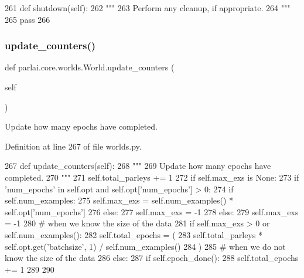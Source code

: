 \begin{DoxyCode}
261     \textcolor{keyword}{def }shutdown(self):
262         \textcolor{stringliteral}{"""}
263 \textcolor{stringliteral}{        Perform any cleanup, if appropriate.}
264 \textcolor{stringliteral}{        """}
265         \textcolor{keywordflow}{pass}
266 
\end{DoxyCode}
\mbox{\label{classparlai_1_1core_1_1worlds_1_1World_a77730e92a331274ab7b6ea3e7b99d1a4}} 
\subsubsection{\texorpdfstring{update\+\_\+counters()}{update\_counters()}}
{\footnotesize\ttfamily def parlai.\+core.\+worlds.\+World.\+update\+\_\+counters (\begin{DoxyParamCaption}\item[{}]{self }\end{DoxyParamCaption})}

\begin{DoxyVerb}Update how many epochs have completed.
\end{DoxyVerb}
 

Definition at line 267 of file worlds.\+py.


\begin{DoxyCode}
267     \textcolor{keyword}{def }update\_counters(self):
268         \textcolor{stringliteral}{"""}
269 \textcolor{stringliteral}{        Update how many epochs have completed.}
270 \textcolor{stringliteral}{        """}
271         self.total\_parleys += 1
272         \textcolor{keywordflow}{if} self.max\_exs \textcolor{keywordflow}{is} \textcolor{keywordtype}{None}:
273             \textcolor{keywordflow}{if} \textcolor{stringliteral}{'num\_epochs'} \textcolor{keywordflow}{in} self.opt \textcolor{keywordflow}{and} self.opt[\textcolor{stringliteral}{'num\_epochs'}] > 0:
274                 \textcolor{keywordflow}{if} self.num\_examples:
275                     self.max\_exs = self.num\_examples() * self.opt[\textcolor{stringliteral}{'num\_epochs'}]
276                 \textcolor{keywordflow}{else}:
277                     self.max\_exs = -1
278             \textcolor{keywordflow}{else}:
279                 self.max\_exs = -1
280         \textcolor{comment}{# when we know the size of the data}
281         \textcolor{keywordflow}{if} self.max\_exs > 0 \textcolor{keywordflow}{or} self.num\_examples():
282             self.total\_epochs = (
283                 self.total\_parleys * self.opt.get(\textcolor{stringliteral}{'batchsize'}, 1) / self.num\_examples()
284             )
285         \textcolor{comment}{# when we do not know the size of the data}
286         \textcolor{keywordflow}{else}:
287             \textcolor{keywordflow}{if} self.epoch\_done():
288                 self.total\_epochs += 1
289 
290 
\end{DoxyCode}


